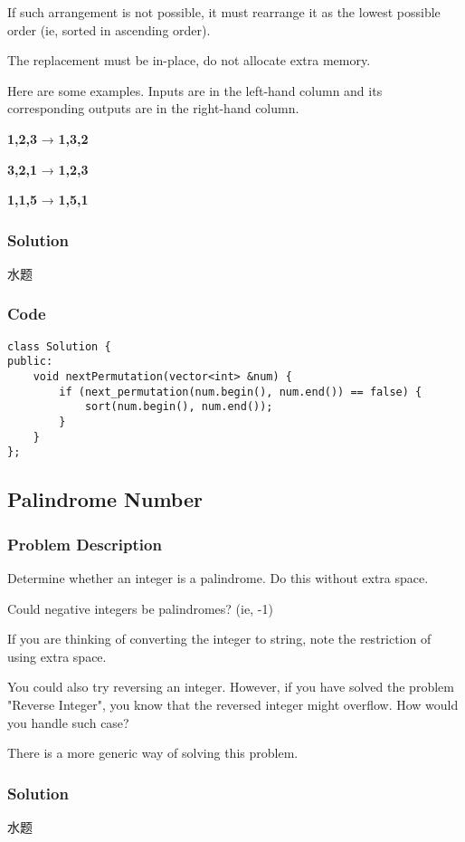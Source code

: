 \documentclass[courier]{article}
\begin{document}
\begin{CJK*}{UTF8}{gkai}
If such arrangement is not possible, it must rearrange it as the lowest possible order (ie, sorted in ascending order).

The replacement must be in-place, do not allocate extra memory.

Here are some examples. Inputs are in the left-hand column and its corresponding outputs are in the right-hand column.


\textbf{1,2,3} → \textbf{1,3,2}


\textbf{3,2,1} → \textbf{1,2,3}


\textbf{1,1,5} → \textbf{1,5,1}



\subsubsection*{Solution}
水题

\subsubsection*{Code}
\begin{lstlisting}
class Solution {
public:
    void nextPermutation(vector<int> &num) {
        if (next_permutation(num.begin(), num.end()) == false) {
            sort(num.begin(), num.end());
        }
    }
}; 
\end{lstlisting}


\subsection{ Palindrome Number }

\subsubsection*{Problem Description}
Determine whether an integer is a palindrome. Do this without extra space.

Could negative integers be palindromes? (ie, -1)

If you are thinking of converting the integer to string, note the restriction of using extra space.

You could also try reversing an integer. However, if you have solved the problem "Reverse Integer", you know that the reversed integer might overflow. How would you handle such case?

There is a more generic way of solving this problem.



\subsubsection*{Solution}
水题


\end{CJK*}
\end{document}
